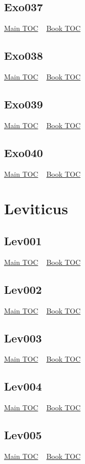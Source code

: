 \documentclass{book}
\begin{document}
  \section{Exo037}\hyperlink{toc}{Main TOC} ~ \hyperref[subsec:Exo]{Book TOC} 
  \section{Exo038}\hyperlink{toc}{Main TOC} ~ \hyperref[subsec:Exo]{Book TOC} 
  \section{Exo039}\hyperlink{toc}{Main TOC} ~ \hyperref[subsec:Exo]{Book TOC} 
  \section{Exo040}\hyperlink{toc}{Main TOC} ~ \hyperref[subsec:Exo]{Book TOC} 
  \chapter{Leviticus} \label{subsec:Lev} \begin{multicols}{2} \minitoc \end{multicols}
  \section{Lev001}\hyperlink{toc}{Main TOC} ~ \hyperref[subsec:Lev]{Book TOC} 
  \section{Lev002}\hyperlink{toc}{Main TOC} ~ \hyperref[subsec:Lev]{Book TOC} 
  \section{Lev003}\hyperlink{toc}{Main TOC} ~ \hyperref[subsec:Lev]{Book TOC} 
  \section{Lev004}\hyperlink{toc}{Main TOC} ~ \hyperref[subsec:Lev]{Book TOC} 
  \section{Lev005}\hyperlink{toc}{Main TOC} ~ \hyperref[subsec:Lev]{Book TOC} 
\end{document}
